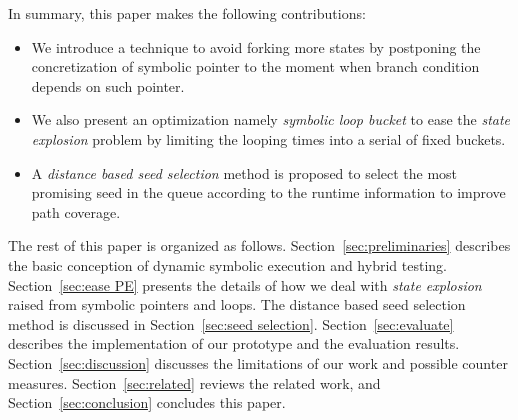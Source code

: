 In summary, this paper makes the following contributions:
\begin{itemize}

\item We introduce a technique to avoid forking more
states by postponing the concretization of symbolic pointer to the
moment when branch condition depends on such pointer.

\item We also
present an optimization namely \emph{symbolic loop bucket} to ease the
\textit{state explosion} problem by limiting the looping times into a
serial of fixed buckets.

\item A \emph{distance based seed selection}
method is proposed to select the most promising seed in the queue
according to the runtime information to improve path coverage.
\end{itemize}


The rest of this paper is organized as follows.
Section~\ref{sec:preliminaries} describes the basic conception of
dynamic symbolic execution and hybrid testing. Section~\ref{sec:ease
PE} presents the details of how we deal with \textit{state explosion}
raised from symbolic pointers and loops. The distance based seed
selection method is discussed in Section~\ref{sec:seed selection}.
Section~\ref{sec:evaluate} describes the implementation of our
prototype and the evaluation results. Section~\ref{sec:discussion}
discusses the limitations of our work and possible counter measures.
Section~\ref{sec:related} reviews the related work, and
Section~\ref{sec:conclusion} concludes this paper.
